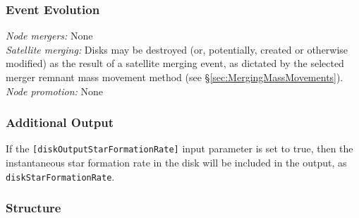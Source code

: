 \subsubsection{Event Evolution}

\noindent\emph{Node mergers:} None\\

\noindent\emph{Satellite merging:} Disks may be destroyed (or, potentially, created or otherwise modified) as the result of a satellite merging event, as dictated by the selected merger remnant mass movement method (see \S\ref{sec:MergingMassMovements}).\\

\noindent\emph{Node promotion:} None\\

\subsubsection{Additional Output}

If the {\tt [diskOutputStarFormationRate]} input parameter is set to true, then the instantaneous star formation rate in the disk will be included in the output, as {\tt diskStarFormationRate}.

\subsubsection{Structure}

